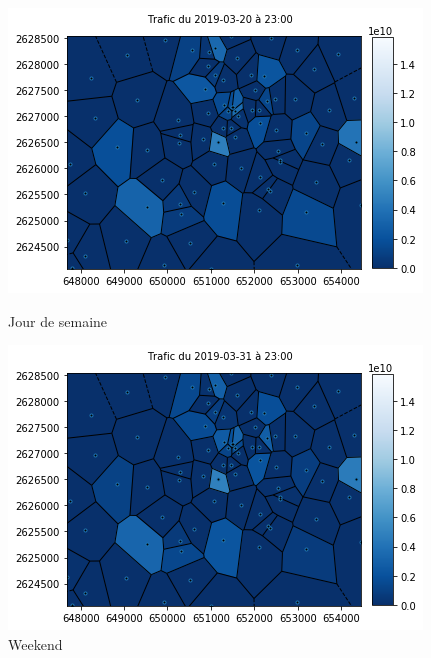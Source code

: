 \documentclass{report}
\begin{document}
\begin{figure}[!htb]
   \begin{minipage}{0.4\textwidth}
     \centering
     \includegraphics[scale=0.55]{images/23_20.png}
     \caption{Jour de semaine}\label{Fig:Data1}
   \end{minipage}\hfill
   \begin{minipage}{0.4\textwidth}
     \centering
     \includegraphics[scale=0.55]{images/23_31.png}
     \caption{Weekend }\label{Fig:Data2}
   \end{minipage}
\end{figure} 
\end{document}
